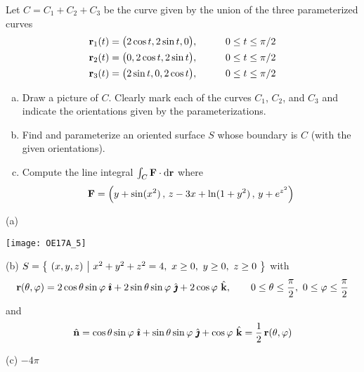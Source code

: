 \begin{question}[M317 2017A] %
Let $C = C_1 + C_2 + C_3$ be the curve given by the union of the 
three parameterized curves
\begin{alignat*}{3}
\mathbf{r}_1(t) &= \big(2\cos t, 2\sin t, 0\big), &\qquad
&0 \le t \le \pi/2 \\
\mathbf{r}_2(t) &= \big(0, 2\cos t, 2\sin t\big), &
&0 \le t \le \pi/2 \\
\mathbf{r}_3(t) &= \big(2\sin t, 0, 2\cos t\big), &
&0 \le t \le \pi/2
\end{alignat*}
\begin{enumerate}[(a)]
\item
Draw a picture of $C$. Clearly mark each of the curves $C_1$, $C_2$, and $C_3$
and indicate the orientations given by the parameterizations.


\item
Find and parameterize an oriented surface $S$ whose boundary is $C$ 
(with the given orientations).

\item
Compute the line integral $\int_C \mathbf{F}\cdot\mathrm{d}\mathbf{r}$ where
\begin{equation*}
\mathbf{F} = \Big(y + \sin(x^2)\,,\, z - 3x + \ln(1 + y^2)\,,\, y + e^{z^2}\Big)
\end{equation*}

\end{enumerate}
\end{question}


\begin{answer} 
(a)
\begin{center}
     \texttt{[image: OE17A\_5]}
\end{center}

(b) $S=\big\{ \ (x,y,z)\ \big|\ x^2+y^2+z^2=4,\ x\ge 0,\ y\ge 0,\ z\ge 0\ \big\}$
with 
\begin{equation*}
\vr(\theta,\varphi)
= 2\cos\theta\sin\varphi\ \hi
+ 2\sin\theta\sin\varphi\ \hj
+ 2\cos\varphi\ \hk,\qquad
0\le\theta\le\frac{\pi}{2},\ 
0\le\varphi\le\frac{\pi}{2}
\end{equation*}
and
\begin{equation*}
\hat{\mathbf{n}} = \cos\theta\sin\varphi\ \hat{\pmb{\imath}}
            +\sin\theta\sin\varphi\ \hat{\pmb{\jmath}}
            +\cos\varphi\ \hat{\mathbf{k}}
=\frac{1}{2}\,\mathbf{r}(\theta,\varphi)
\end{equation*}

(c) $-4\pi$
\end{answer}

